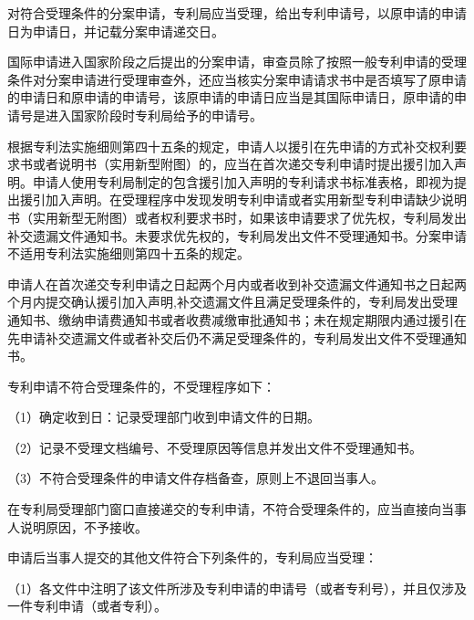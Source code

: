对符合受理条件的分案申请，专利局应当受理，给出专利申请号，以原申请的申请日为申请日，并记载分案申请递交日。

国际申请进入国家阶段之后提出的分案申请，审查员除了按照一般专利申请的受理条件对分案申请进行受理审查外，还应当核实分案申请请求书中是否填写了原申请的申请日和原申请的申请号，该原申请的申请日应当是其国际申请日，原申请的申请号是进入国家阶段时专利局给予的申请号。

根据专利法实施细则第四十五条的规定，申请人以援引在先申请的方式补交权利要求书或者说明书（实用新型附图）的，应当在首次递交专利申请时提出援引加入声明。申请人使用专利局制定的包含援引加入声明的专利请求书标准表格，即视为提出援引加入声明。在受理程序中发现发明专利申请或者实用新型专利申请缺少说明书（实用新型无附图）或者权利要求书时，如果该申请要求了优先权，专利局发出补交遗漏文件通知书。未要求优先权的，专利局发出文件不受理通知书。分案申请不适用专利法实施细则第四十五条的规定。

申请人在首次递交专利申请之日起两个月内或者收到补交遗漏文件通知书之日起两个月内提交确认援引加入声明,补交遗漏文件且满足受理条件的，专利局发出受理通知书、缴纳申请费通知书或者收费减缴审批通知书；未在规定期限内通过援引在先申请补交遗漏文件或者补交后仍不满足受理条件的，专利局发出文件不受理通知书。

专利申请不符合受理条件的，不受理程序如下：

{\setlength{\parindent}{17.1bp}（1）确定收到日：记录受理部门收到申请文件的日期。\par}

{\setlength{\parindent}{17.1bp}（2）记录不受理文档编号、不受理原因等信息并发出文件不受理通知书。\par}

{\setlength{\parindent}{17.1bp}（3）不符合受理条件的申请文件存档备查，原则上不退回当事人。\par}

在专利局受理部门窗口直接递交的专利申请，不符合受理条件的，应当直接向当事人说明原因，不予接收。

申请后当事人提交的其他文件符合下列条件的，专利局应当受理：

{\setlength{\parindent}{17.1bp}（1）各文件中注明了该文件所涉及专利申请的申请号（或者专利号），并且仅涉及一件专利申请（或者专利）。\par}

